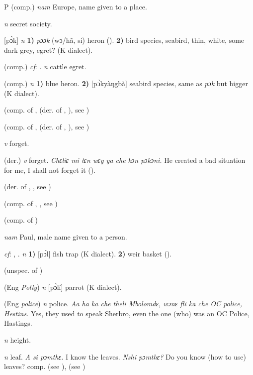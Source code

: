 \begin{letter}{P}
 (comp.) \textit{nam} Europe, name given to a place. 

 \textit{n} secret society.

 [pͻ̀k] \textit{n} \textbf{1)} \textit{pɔɔk} (wɔ/hã, si) heron (\citealt{Pichl1967}). \textbf{2)} bird species, seabird, thin, white, some dark grey, egret? (K dialect). 

 (comp.) \textit{cf}: . \textit{n} cattle egret.

 (comp.) \textit{n} \textbf{1)} blue heron. \textbf{2)} [pͻ̀kyàŋgbà] seabird species, same as \textit{pɔk} but bigger (K dialect). 

 (comp. of ,  (der. of , ), see ) 

 (comp. of ,  (der. of , ), see ) 

 \textit{v} forget.

 (der.) \textit{v} forget. \textit{Chɛliɛ mi tɛn wɛy ya che kɔn pɔkɔni.} He created a bad situation for me, I shall not forget it (\citealt{Pichl1967}). 

 (der. of , , see ) 

 (comp. of , , see ) 

 (comp. of ) 

 \textit{nam} Paul, male name given to a person.

 \textit{cf}: , . \textit{n} \textbf{1)} [pɔ́l] fish trap (K dialect). \textbf{2)} weir basket (\citealt{Pichl1967}). 

 (unspec. of ) 

 (Eng \textit{Polly}) \textit{n} [pͻ̀lí] parrot (K dialect). 

 (Eng \textit{police}) \textit{n} police. \textit{Aa ha ka che theli Mbolomdɛ, wɔnɛ fli ka che OC police, Hestins.} Yes, they used to speak Sherbro, even the one (who) was an OC Police, Hastings.

 \textit{n} height.

 \textit{n} leaf. \textit{A si pɔmthɛ.} I know the leaves. \textit{Nshi pɔmthɛ?} Do you know (how to use) leaves? comp.  (see ),  (see ) 


\end{letter}
